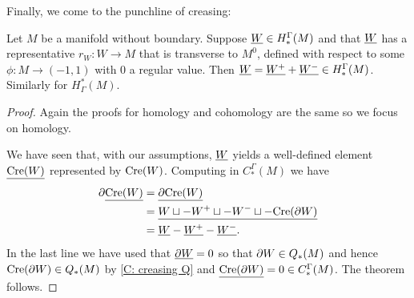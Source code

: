 Finally, we come to the punchline of creasing:

\begin{theorem}\label{T: cohomology creasing}
Let $M$ be a manifold without boundary. Suppose $\underline{W} \in H_*^\Gamma(M)$ and that $\underline{W}$ has a representative $r_W \colon W \to M$ that is transverse to $M^0$, defined with respect to some $\phi \colon M \to (-1,1)$ with $0$ a regular value.
Then $\underline{W} = \underline{W^+}+\underline{W^-} \in H_*^\Gamma(M)$. Similarly for $H^*_\Gamma(M)$.
\end{theorem}
\begin{proof}
Again the proofs for homology and cohomology are the same so we focus on homology.

We have seen that, with our assumptions, $\underline{W}$ yields a well-defined element $\underline{\mathrm{Cre}(W)}$ represented by $\mathrm{Cre}(W)$. Computing in $C_*^\Gamma(M)$ we have
\begin{align*}
\partial \underline{\mathrm{Cre}(W)}& = \underline{\partial \mathrm{Cre}(W) }\\
& = \underline{W\sqcup -W^+\sqcup -W^-\sqcup -\mathrm{Cre}(\partial W)}\\
& = \underline{W} -\underline{W^+}-\underline{W^-}.
\end{align*}
In the last line we have used that $\underline{\partial W} = 0$ so that $\partial W \in Q_*(M)$ and hence $\mathrm{Cre}(\partial W) \in Q_*(M)$ by \cref{C: creasing Q} and $\underline{\mathrm{Cre}(\partial W)} = 0 \in C_*^\Gamma(M)$.
The theorem follows.
\end{proof}

